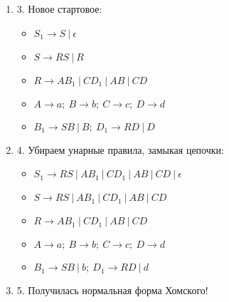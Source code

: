\documentclass[12pt]{article}
\newenvironment{MyList}[1][4pt]{
  \begin{enumerate}[1.]
  \setlength{\parskip}{0pt}
  \setlength{\itemsep}{#1}
}{       
  \end{enumerate}
}
\begin{document}
\begin{MyList}[8pt]
\begin{MyList}[8pt]
\begin{itemize}
		\end{itemize}
		Убираем $\epsilon$-правила: \\
		\begin{itemize}
			\item $S \to R S \ | \ R \ | \ \epsilon$
			\item $R \to A B_1 \ | \ C D_1 \ | \ A B \ | \ C D$
			\item $A \to a; \ B \to b; \ C \to c; \ D \to d$
			\item $B_1 \to S B \ | \ B; \ D_1 \to R D \ | \ D$
		\end{itemize}
	\item [3.] Новое стартовое: \\
		\begin{itemize}
			\item $S_1 \to S \ | \ \epsilon$
			\item $S \to R S \ | \ R$
			\item $R \to A B_1 \ | \ C D_1 \ | \ A B \ | \ C D$
			\item $A \to a; \ B \to b; \ C \to c; \ D \to d$
			\item $B_1 \to S B \ | \ B; \ D_1 \to R D \ | \ D$
		\end{itemize}
	\item [4.] Убираем унарные правила, замыкая цепочки: \\
		\begin{itemize}
			\item $S_1 \to R S \ | \ A B_1 \ | \ C D_1 \ | \ A B \ | \ C D \ | \ \epsilon$
			\item $S \to R S \ | \ A B_1 \ | \ C D_1 \ | \ A B \ | \ C D$
			\item $R \to A B_1 \ | \ C D_1 \ | \ A B \ | \ C D$
			\item $A \to a; \ B \to b; \ C \to c; \ D \to d$
			\item $B_1 \to S B \ | \ b; \ D_1 \to R D \ | \ d$
		\end{itemize}
	\item [5.]
	Получилась нормальная форма Хомского!
 		
	\end{MyList} 
 

\end{MyList}
\end{document}
